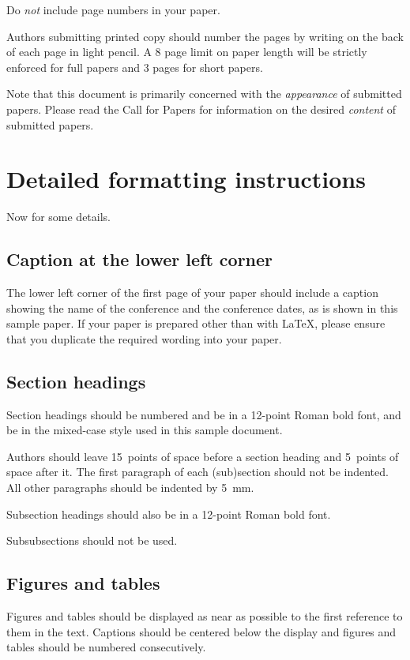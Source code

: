 \documentclass[twocolumn]{article}
\begin{document}
Do \emph{not} include page numbers in your paper.

Authors submitting printed copy should number the pages by writing on
the back of each page in light pencil.
A 8 page limit on paper length will be strictly enforced for full
papers and 3 pages for short papers.

Note that this document is primarily concerned with the
\emph{appearance} of submitted papers.
Please read the Call for Papers for information on the desired
\emph{content} of submitted papers.


\section{Detailed formatting instructions}

Now for some details.

\subsection{Caption at the lower left corner}

The lower left corner of the first page of your paper should include
a caption showing the name of the conference and the conference
dates, as is shown in this sample paper.
If your paper is prepared other than with {\LaTeX}, please ensure
that you duplicate the required wording into your paper.


\subsection{Section headings}

Section headings should be numbered and be in a 12-point Roman bold font,
and be in the mixed-case style used in this sample document.

Authors should leave 15~points of space before a section heading and
5~points of space after it.
The first paragraph of each (sub)section should not be indented.
All other paragraphs should be indented by 5~mm.

Subsection headings should also be in a 12-point Roman bold font.

Subsubsections should not be used.

\subsection{Figures and tables}

Figures and tables should be displayed as near as possible to the
first reference to them in the text.
Captions should be centered below the display and figures and tables
should be numbered consecutively.
\end{document}

